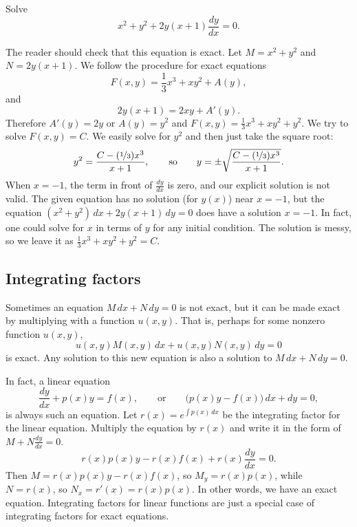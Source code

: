 \begin{example} \label{exact:exampleabove}
Solve
\begin{equation*}
x^2+y^2 + 2y(x+1) \frac{dy}{dx} = 0 .
\end{equation*}

The reader should check that this equation is exact.
Let $M= x^2+y^2$ and $N=2y(x+1)$.
We follow the procedure for exact equations
\begin{equation*}
F(x,y) = \frac{1}{3}x^3 + xy^2 + A(y) ,
\end{equation*}
and
\begin{equation*}
2y(x+1) = 2xy + A'(y) .
\end{equation*}
Therefore $A'(y) = 2y$ or $A(y) = y^2$ and $F(x,y) = \frac{1}{3}x^3 + xy^2 +
y^2$.
We try to solve $F(x,y) = C$.  We easily solve for $y^2$ and then just take
the square root:
\begin{equation*}
y^2 = \frac{C-(\nicefrac{1}{3})x^3}{x+1},
\qquad \text{so} \qquad
y = \pm \sqrt{\frac{C-(\nicefrac{1}{3})x^3}{x+1}} .
\end{equation*}
When $x=-1$, the term in front of $\frac{dy}{dx}$ is zero,
and our explicit solution is not valid.
The given equation has no solution (for $y(x)$) near $x=-1$, but
the equation $(x^2+y^2) \, dx + 2y(x+1) \, dy = 0$ does have
a solution $x=-1$.  In fact, one could solve for $x$ in terms
of $y$ for any initial condition.  The solution is messy,
so we leave it as $\frac{1}{3}x^3 + xy^2 + y^2 = C$.
\end{example}

\subsection{Integrating factors}

Sometimes an equation $M\, dx + N \, dy = 0$ is not exact, but it can be
made exact by multiplying with a function $u(x,y)$.  That is, perhaps
for some nonzero function $u(x,y)$,
\begin{equation*}
u(x,y) M(x,y) \, dx + u(x,y) N(x,y) \, dy = 0
\end{equation*}
is exact.  Any solution to this new equation is also a solution to
$M\, dx + N \, dy = 0$.

In fact, a linear equation
\begin{equation*}
\frac{dy}{dx} + p(x) y = f(x), \qquad
\text{or} \qquad
\bigl( p(x) y - f(x) \bigr)\, dx +  dy  = 0,
\end{equation*}
is always such an equation.  Let $r(x) = e^{\int p(x)\,dx}$ be the
integrating factor for the linear equation.  Multiply the equation by $r(x)$
and write it in the form of $M + N \frac{dy}{dx} = 0$.
\begin{equation*}
r(x) p(x) y - r(x) f(x) + r(x) \frac{dy}{dx} = 0 .
\end{equation*}
Then $M = r(x) p(x) y - r(x) f(x)$, so
$M_y = r(x) p(x)$, while $N = r(x)$, so
$N_x = r'(x) = r(x) p(x)$.  In other words, we have an exact equation.
Integrating
factors for linear functions are just a special case of integrating
factors for exact equations.

